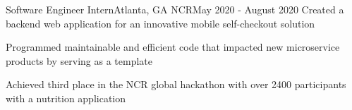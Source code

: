 \resumeSubheading
{Software Engineer Intern}{Atlanta, GA}
{NCR}{May 2020 - August 2020}
\resumeItemListStart
\resumeItem
{
  Created a backend web application for an innovative mobile self-checkout solution
}

\resumeItem
{
  Programmed maintainable and efficient code that impacted new microservice
  products by serving as a template
}

\resumeItem
{
  Achieved third place in the NCR global hackathon with over 2400 participants
  with a nutrition application
}
\resumeItemListEnd

